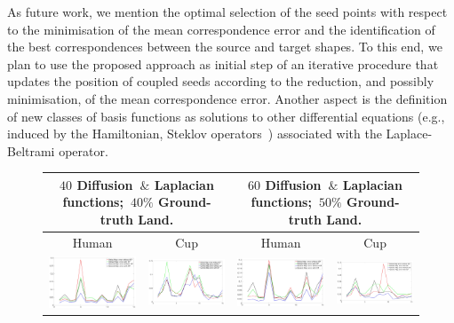\documentclass[acmtog,authorversion]{acmart}
\begin{document}
As future work, we mention the optimal selection of the seed points with respect to the minimisation of the mean correspondence error and the identification of the best correspondences between the source and target shapes. To this end, we plan to use the proposed approach as initial step of an iterative procedure that updates the position of coupled seeds according to the reduction, and possibly minimisation, of the mean correspondence error. Another aspect is the definition of new classes of basis functions as solutions to other differential equations (e.g., induced by the Hamiltonian, Steklov operators~\citep{CHOUKROUN-CORR2017,WANG2018}) associated with the Laplace-Beltrami operator.
%

%

%
\newpage
%
\begin{figure}
\centering
\begin{tabular}{cc||cc}
\multicolumn{2}{c||}{\textbf{$40$ Diffusion~$\&$ Laplacian functions;~$40\%$ Ground-truth Land.}}
&\multicolumn{2}{|c}{\textbf{$60$ Diffusion~$\&$ Laplacian functions;~$50\%$ Ground-truth Land.}}\\
\hline
Human &Cup &Human &Cup\\
\includegraphics[width=120pt]{FMAP-images/1-STATISTICS-40.jpg} 		%
&\includegraphics[width=120pt]{FMAP-images/2-STATISTICS-40.jpg} 	%
&\includegraphics[width=120pt]{FMAP-images/1-STATISTICS-50.jpg} 	%
&\includegraphics[width=120pt]{FMAP-images/2-STATISTICS-50.jpg}\\	%

\end{tabular}
\end{figure}
\end{document}
